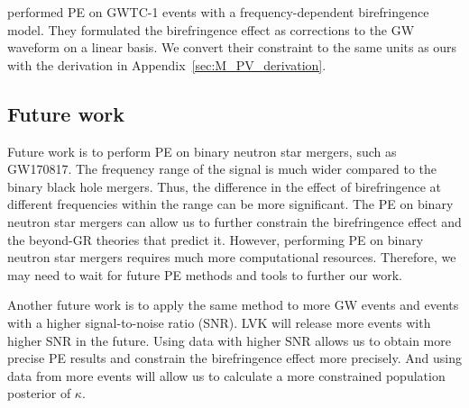\documentclass[aps,prd,twocolumn,superscriptaddress,preprintnumbers,floatfix,nofootinbib]{revtex4-2}
\begin{document}
\citet{Wang_2021} performed \ac{PE} on GWTC-1 events with a frequency-dependent birefringence model.
They formulated the birefringence effect as corrections to the GW waveform on a linear basis.
We convert their constraint to the same units as ours with the derivation in Appendix~\ref{sec:M_PV_derivation}.

\subsection{Future work}
Future work is to perform \ac{PE} on binary neutron star mergers, such as GW170817.
The frequency range of the signal is much wider compared to the binary black hole mergers.
Thus, the difference in the effect of birefringence at different frequencies within the range can be more significant.
The \ac{PE} on binary neutron star mergers can allow us to further constrain the birefringence effect and the beyond-GR theories that predict it.
However, performing \ac{PE} on binary neutron star mergers requires much more computational resources.
Therefore, we may need to wait for future \ac{PE} methods and tools to further our work.

Another future work is to apply the same method to more GW events and events with a higher signal-to-noise ratio (SNR).
LVK will release more events with higher SNR in the future.
Using data with higher SNR allows us to obtain more precise \ac{PE} results and constrain the birefringence effect more precisely.
And using data from more events will allow us to calculate a more constrained population posterior of $\kappa$.
\end{document}

